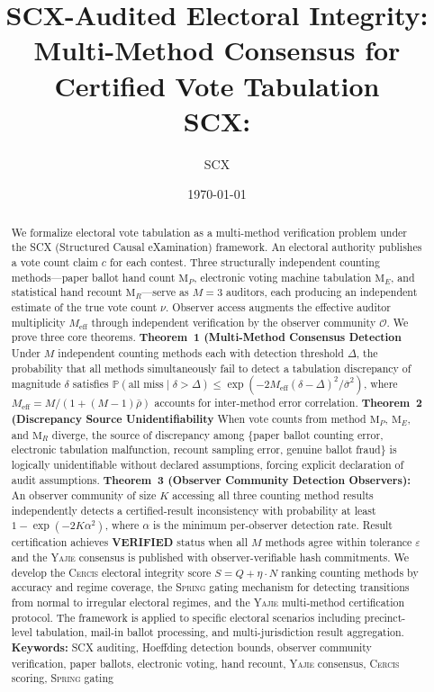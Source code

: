 \documentclass[11pt,a4paper]{article}
\title{\textbf{SCX-Audited Electoral Integrity:}\\
\large Multi-Method Consensus for Certified Vote Tabulation\\
\small SCX: }
\author{SCX}
\date{\today}
\theoremstyle{definition}
\newcommand{\Yajie}{\textsc{Yajie}}
\newcommand{\Spring}{\textsc{Spring}}
\newcommand{\Cercis}{\textsc{Cercis}}
\newcommand{\SCX}{\textsc{SCX}}
\newcommand{\Pbb}{\mathbb{P}}
\newcommand{\observerSet}{\mathcal{O}}
\newcommand{\method}[1]{\mathrm{M}_{#1}}
\begin{document}
\maketitle
\begin{abstract}
We formalize electoral vote tabulation as a multi-method verification problem under the \SCX{} (Structured Causal eXamination) framework. An electoral authority publishes a vote count claim $c$ for each contest. Three structurally independent counting methods---paper ballot hand count $\method{P}$, electronic voting machine tabulation $\method{E}$, and statistical hand recount $\method{R}$---serve as $M = 3$ auditors, each producing an independent estimate of the true vote count $\nu$. Observer access augments the effective auditor multiplicity $M_{\text{eff}}$ through independent verification by the observer community $\observerSet$. We prove three core theorems. \textbf{Theorem~1 (Multi-Method Consensus Detection} Under $M$ independent counting methods each with detection threshold $\Delta$, the probability that all methods simultaneously fail to detect a tabulation discrepancy of magnitude $\delta$ satisfies $\Pbb(\text{all miss} \mid \delta > \Delta) \leq \exp(-2 M_{\text{eff}} (\delta - \Delta)^2 / \bar{\sigma}^2)$, where $M_{\text{eff}} = M/(1 + (M-1)\bar{\rho})$ accounts for inter-method error correlation. \textbf{Theorem~2 (Discrepancy Source Unidentifiability} When vote counts from method $\method{P}$, $\method{E}$, and $\method{R}$ diverge, the source of discrepancy among \{paper ballot counting error, electronic tabulation malfunction, recount sampling error, genuine ballot fraud\} is logically unidentifiable without declared assumptions, forcing explicit declaration of audit assumptions. \textbf{Theorem~3 (Observer Community Detection Observers):} An observer community of size $K$ accessing all three counting method results independently detects a certified-result inconsistency with probability at least $1 - \exp(-2K \alpha^2)$, where $\alpha$ is the minimum per-observer detection rate. Result certification achieves \textbf{VERIFIED} status when all $M$ methods agree within tolerance $\varepsilon$ and the \Yajie{} consensus is published with observer-verifiable hash commitments. We develop the \Cercis{} electoral integrity score $S = Q + \eta \cdot N$ ranking counting methods by accuracy and regime coverage, the \Spring{} gating mechanism for detecting transitions from normal to irregular electoral regimes, and the \Yajie{} multi-method certification protocol. The framework is applied to specific electoral scenarios including precinct-level tabulation, mail-in ballot processing, and multi-jurisdiction result aggregation.
\medskip
\noindent\textbf{Keywords:} SCX auditing,  Hoeffding detection bounds,  observer community verification,  paper ballots,  electronic voting,  hand recount,  \Yajie{} consensus,  \Cercis{} scoring,  \Spring{} gating
\end{abstract}
\end{document}
